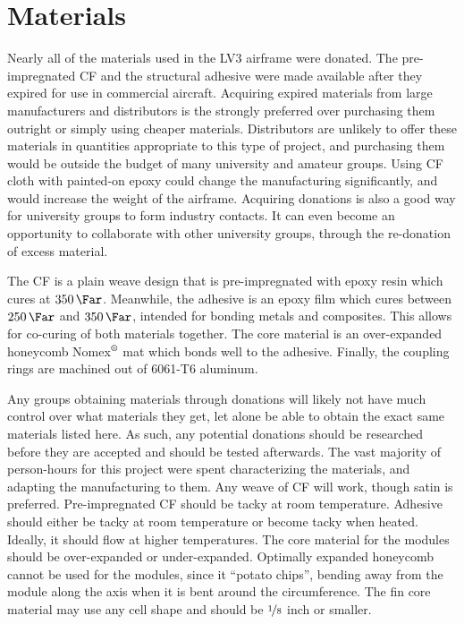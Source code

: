 \documentclass{aiaa-tc}%
\newcommand{\mathregistered}{\text{\textregistered}}
\begin{document}
\section{Materials}
Nearly all of the materials used in the LV3 airframe were donated. The pre-impregnated CF and the structural adhesive were made available after they expired for use in commercial aircraft. 
Acquiring expired materials from large manufacturers and distributors is the strongly preferred over purchasing them outright or simply using cheaper materials. 
Distributors are unlikely to offer these materials in quantities appropriate to this type of project, and purchasing them would be outside the budget of many university and amateur groups. 
Using CF cloth with painted-on epoxy could change the manufacturing significantly, and would increase the weight of the airframe. 
Acquiring donations is also a good way for university groups to form industry contacts. It can even become an opportunity to collaborate with other university groups, through the re-donation of excess material. 

The CF is a plain weave design that is pre-impregnated with epoxy resin which cures at $\SI{350}{\Far}$.
Meanwhile, the adhesive is an epoxy film which cures between $\SI{250}{\Far}$ and $\SI{350}{\Far}$, intended for bonding metals and composites. 
This allows for co-curing of both materials together. The core material is an over-expanded honeycomb Nomex$^\mathregistered$ mat which bonds well to the adhesive.
Finally, the coupling rings are machined out of 6061-T6 aluminum. 

Any groups obtaining materials through donations will likely not have much control over what materials they get, let alone be able to obtain the exact same materials listed here.
As such, any potential donations should be researched before they are accepted and should be tested afterwards. 
The vast majority of person-hours for this project were spent characterizing the materials, and adapting the manufacturing to them.
Any weave of CF will work, though satin is preferred. Pre-impregnated CF should be tacky at room temperature.
Adhesive should either be tacky at room temperature or become tacky when heated. Ideally, it should flow at higher temperatures. 
The core material for the modules should be over-expanded or under-expanded. 
Optimally expanded honeycomb cannot be used for the modules, since it ``potato chips'', bending away from the module along the axis when it is bent around the circumference. 
The fin core material may use any cell shape and should be $\nicefrac{1}{8}$ inch or smaller. 
\end{document}
